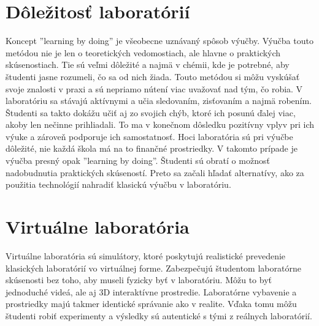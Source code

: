 \documentclass[10pt,oneside,slovak,a4paper]{article}
\begin{document}
\section{Dôležitosť laboratórií} \label{d_laboratorii}
Koncept ''learning by doing'' je všeobecne uznávaný spôsob výučby. Výučba touto metódou nie je len o teoretických vedomostiach, ale hlavne o praktických skúsenostiach. Tie sú veľmi dôležité a najmä v chémii, kde je potrebné, aby študenti jasne rozumeli, čo sa od nich žiada. Touto metódou si môžu vyskúšať svoje znalosti v praxi a sú nepriamo nútení viac uvažovať nad tým, čo robia. V laboratóriu sa stávajú aktívnymi a učia sledovaním, zisťovaním a najmä robením. Študenti sa takto dokážu učiť aj zo svojich chýb, ktoré ich posunú ďalej viac, akoby len nečinne prihliadali. To ma v konečnom dôsledku pozitívny vplyv pri ich výuke a zároveň podporuje ich samostatnosť. Hoci laboratória sú pri výučbe dôležité, nie každá škola má na to finančné prostriedky. V takomto prípade je výučba presný opak ''learning by doing''. Študenti sú obratí o možnosť nadobudnutia praktických skúseností. Preto sa začali hľadať alternatívy, ako za použitia technológií nahradiť klasickú výučbu v laboratóriu. \cite{tuysuz2010effect}

\section {Virtuálne laboratória} \label{virtualne_laboratoria}
Virtuálne laboratória sú simulátory, ktoré poskytujú realistické prevedenie klasických laboratórií vo virtuálnej forme. Zabezpečujú študentom laboratórne skúsenosti bez toho, aby museli fyzicky byť v laboratóriu. Môžu to byť jednoduché videá, ale aj 3D interaktívne prostredie. Laboratórne vybavenie a prostriedky majú takmer identické správanie ako v realite. Vďaka tomu môžu študenti robiť experimenty a výsledky sú autentické s tými z reálnych laboratórií. \cite{latifah2019effect}
\end{document}
